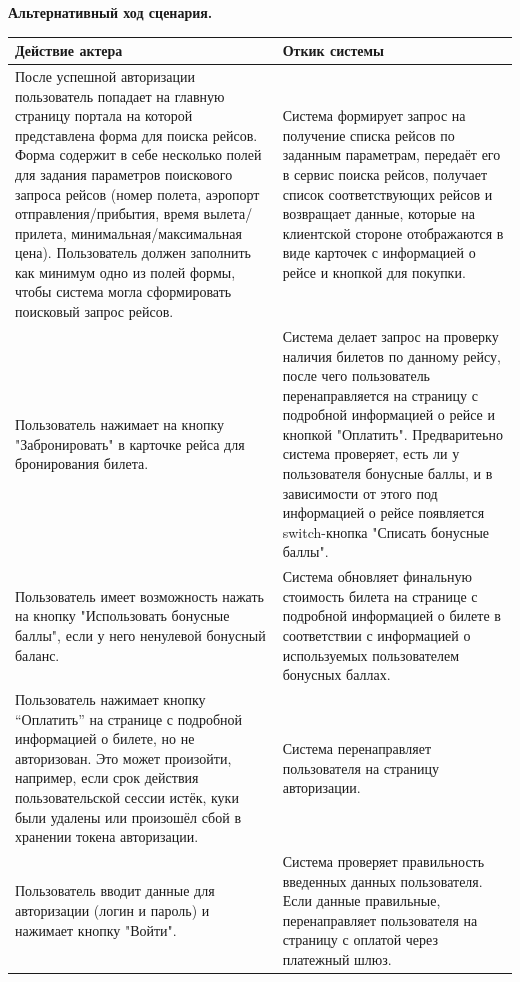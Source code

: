 \textbf{Альтернативный ход сценария.}
\begin{longtable}{|p{8cm}|p{8cm}|}
    \hline
    \textbf{Действие актера} & \textbf{Откик системы} \\
    \endhead
    
    \hline
    После успешной авторизации пользователь попадает на главную страницу портала на которой представлена форма для поиска рейсов. Форма содержит в себе несколько полей для задания параметров поискового запроса рейсов
    (номер полета, аэропорт отправления/прибытия, время вылета/прилета, минимальная/максимальная цена). Пользователь должен заполнить как минимум одно из полей формы, чтобы система могла сформировать поисковый запрос рейсов. &
    Система формирует запрос на получение списка рейсов по заданным параметрам, передаёт его в сервис поиска рейсов, получает список соответствующих рейсов и возвращает данные, которые на клиентской стороне отображаются в виде карточек с информацией о рейсе и кнопкой для покупки. \\
    
    \hline
    Пользователь нажимает на кнопку "Забронировать" в карточке рейса для бронирования билета. & 
    Система делает запрос на проверку наличия билетов по данному рейсу, после чего пользователь перенаправляется на страницу с подробной информацией о рейсе и кнопкой "Оплатить".
    Предваритеьно система проверяет, есть ли у пользователя бонусные баллы, и в зависимости от этого под информацией о рейсе появляется switch-кнопка "Списать бонусные баллы". \\
    
    \hline
    Пользователь имеет возможность нажать на кнопку "Использовать бонусные баллы", если у него ненулевой бонусный баланс. &
    Система обновляет финальную стоимость билета на странице с подробной информацией о билете в соответствии с информацией о используемых пользователем бонусных баллах. \\
    
    \hline
    Пользователь нажимает кнопку “Оплатить” на странице с подробной информацией о билете, но не авторизован. Это может произойти, например, если срок действия пользовательской сессии истёк, куки были удалены или произошёл сбой в хранении токена авторизации. &
    Система перенаправляет пользователя на страницу авторизации. \\
    
    \hline
    Пользователь вводит данные для авторизации (логин и пароль) и нажимает кнопку "Войти". &
    Система проверяет правильность введенных данных пользователя. Если данные правильные, перенаправляет пользователя на страницу с оплатой через платежный шлюз. \\
    

\end{longtable}
